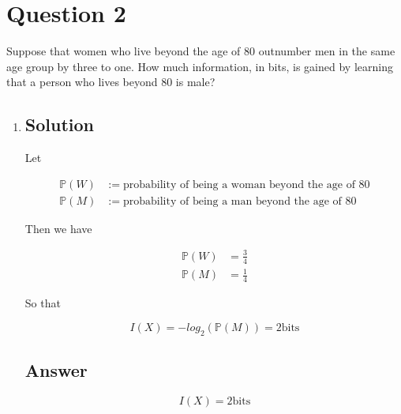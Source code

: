 \documentclass[12pt]{article}
\newcommand{\bP}{\mathbb{P}}
\begin{document}
	
	\section*{Question 2}
	
	\noindent Suppose that women who live beyond the age of $80$ outnumber men in the same age group by three to one. How much information, in bits, is gained by learning that a person who lives beyond $80$ is male?
	
	\bigskip
	
	\begin{enumerate}[label={},leftmargin=0in]\item
		\subsection*{Solution}
		
			Let
			
			\[
				\begin{aligned}
					\bP(W) &:= \text{probability of being a woman beyond the age of $80$}\\
					\bP(M) &:= \text{probability of being a man beyond the age of $80$}
				\end{aligned}
			\]
			
			Then we have
			
			\[
				\begin{aligned}
					\bP(W) &= \frac{3}{4}\\
					\bP(M) &= \frac{1}{4}
				\end{aligned}
			\]
			
			So that
			
			\[
				I(X) = -log_2(\bP(M)) = 2 \text{bits}
			\]

		\subsection*{Answer}
		
		\[\boxed{I(X) = 2 \text{bits}}\]
	\end{enumerate}
	
\end{document}
